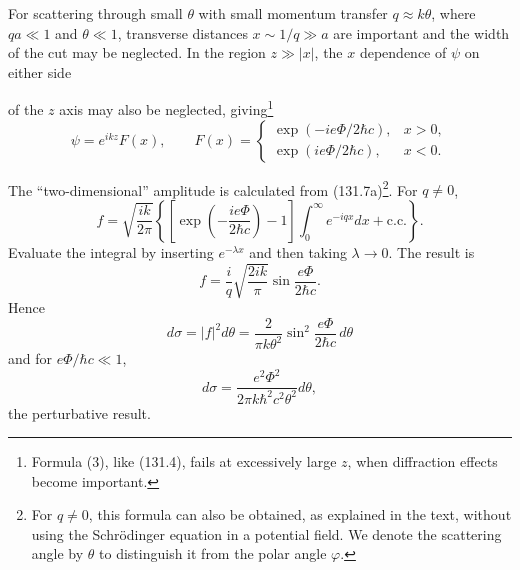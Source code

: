 For scattering through small $\theta$ with small momentum transfer
$q\approx k\theta$, where $qa\ll1$ and $\theta\ll1$, transverse distances
$x\sim1/q\gg a$ are important and the width of the cut may be neglected. In
the region $z\gg|x|$, the $x$ dependence of $\psi$ on either side

of the $z$ axis may also be neglected, giving\footnote{Formula (3), like
(131.4), fails at excessively large $z$, when diffraction effects become
important.}
\begin{equation}
 \psi=e^{ikz}F(x),\qquad
 F(x)=\begin{cases}
 \exp(-ie\Phi/2\hbar c),&x>0,\\
 \exp(ie\Phi/2\hbar c),&x<0.
 \end{cases}
 \tag{3}
\end{equation}

The ``two-dimensional'' amplitude is calculated from (131.7a)\footnote{For
$q\ne0$, this formula can also be obtained, as explained in the text, without
using the Schrödinger equation in a potential field. We denote the scattering
angle by $\theta$ to distinguish it from the polar angle $\varphi$.}. For
$q\ne0$,
\[
 f=\sqrt{\frac{ik}{2\pi}}\left\{
 \left[\exp\left(-\frac{ie\Phi}{2\hbar c}\right)-1\right]
 \int_0^\infty e^{-iqx}dx+\text{c.c.}\right\}.
\]
Evaluate the integral by inserting $e^{-\lambda x}$ and then taking
$\lambda\to0$. The result is
\[
 f=\frac{i}{q}\sqrt{\frac{2ik}{\pi}}
 \sin\frac{e\Phi}{2\hbar c}.
\]
Hence
\begin{equation}
 d\sigma=|f|^2d\theta=\frac{2}{\pi k\theta^2}
 \sin^2\frac{e\Phi}{2\hbar c}\,d\theta
 \tag{4}
\end{equation}
and for $e\Phi/\hbar c\ll1$,
\[
 d\sigma=\frac{e^2\Phi^2}{2\pi k\hbar^2c^2\theta^2}d\theta,
\]
the perturbative result.


